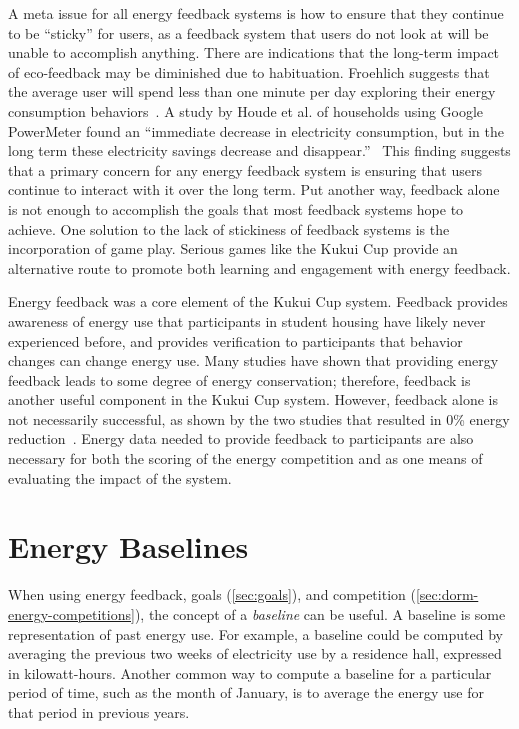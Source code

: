 A meta issue for all energy feedback systems is how to ensure that they continue to be ``sticky'' for users, as a feedback system that users do not look at will be unable to accomplish anything. There are indications that the long-term impact of eco-feedback may be diminished due to habituation. Froehlich suggests that the average user will spend less than one minute per day exploring their energy consumption behaviors~\cite{Froehlich2010-BECC}. A study by Houde et al. of households using Google PowerMeter found an ``immediate decrease in electricity consumption, but in the long term these electricity savings decrease and disappear.''~\cite{Houde2013-powermeter} This finding suggests that a primary concern for any energy feedback system is ensuring that users continue to interact with it over the long term. Put another way, feedback alone is not enough to accomplish the goals that most feedback systems hope to achieve. One solution to the lack of stickiness of feedback systems is the incorporation of game play. Serious games like the Kukui Cup provide an alternative route to promote both learning and engagement with energy feedback.

Energy feedback was a core element of the Kukui Cup system. Feedback provides awareness of energy use that participants in student housing have likely never experienced before, and provides verification to participants that behavior changes can change energy use. Many studies have shown that providing energy feedback leads to some degree of energy conservation; therefore, feedback is another useful component in the Kukui Cup system. However, feedback alone is not necessarily successful, as shown by the two studies that resulted in 0\% energy reduction~\cite{Foster-2012}. Energy data needed to provide feedback to participants are also necessary for both the scoring of the energy competition and as one means of evaluating the impact of the system.


\section{Energy Baselines}
\label{sec:energy-baselines}

When using energy feedback, goals (\autoref{sec:goals}), and competition (\autoref{sec:dorm-energy-competitions}), the concept of a \emph{baseline} can be useful. A baseline is some representation of past energy use. For example, a baseline could be computed by averaging the previous two weeks of electricity use by a residence hall, expressed in kilowatt-hours. Another common way to compute a baseline for a particular period of time, such as the month of January, is to average the energy use for that period in previous years.

